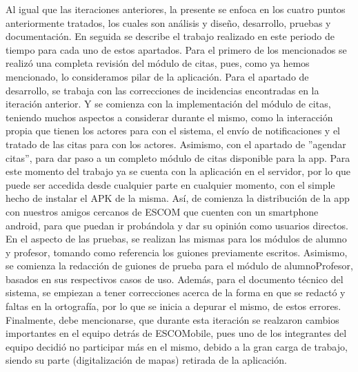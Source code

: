 \noindent
Al igual que las iteraciones anteriores, la presente se enfoca en los cuatro puntos anteriormente tratados, los cuales son análisis y diseño, desarrollo, pruebas y documentación. En seguida se describe el trabajo realizado en este periodo de tiempo para cada uno de estos apartados. 
\newline
\newline
Para el primero de los mencionados se realizó una completa revisión del módulo de citas, pues, como ya hemos mencionado, lo consideramos pilar de la aplicación. 
\newline
\newline
Para el apartado de desarrollo, se trabaja con las correcciones de incidencias encontradas en la iteración anterior. Y se comienza con la implementación del módulo de citas, teniendo muchos aspectos a considerar durante el mismo, como la interacción propia que tienen los actores para con el sistema, el envío de notificaciones y el tratado de las citas para con los actores. Asimismo, con el apartado de ''agendar citas'', para dar paso a un completo módulo de citas disponible para la app. 
\newline
Para este momento del trabajo ya se cuenta con la aplicación en el servidor, por lo que puede ser accedida desde cualquier parte en cualquier momento, con el simple hecho de instalar el APK de la misma. Así, de comienza la distribución de la app con nuestros amigos cercanos de ESCOM que cuenten con un smartphone android, para que puedan ir probándola y dar su opinión como usuarios directos. 
\newline
\newline
En el aspecto de las pruebas, se realizan las mismas para los módulos de alumno y profesor, tomando como referencia los guiones previamente escritos. Asimismo, se comienza la redacción de guiones de prueba para el módulo de alumnoProfesor, basados en sus respectivos casos de uso. 
\newline
Además, para el documento técnico del sistema, se empiezan a tener correcciones acerca de la forma en que se redactó y faltas en la ortografía, por lo que se inicia a depurar el mismo, de estos errores.
\newline
\newline
Finalmente, debe mencionarse, que durante esta iteración se realzaron cambios importantes en el equipo detrás de ESCOMobile, pues uno de los integrantes del equipo decidió no participar más en el mismo, debido a la gran carga de trabajo, siendo su parte (digitalización de mapas) retirada de la aplicación. 
